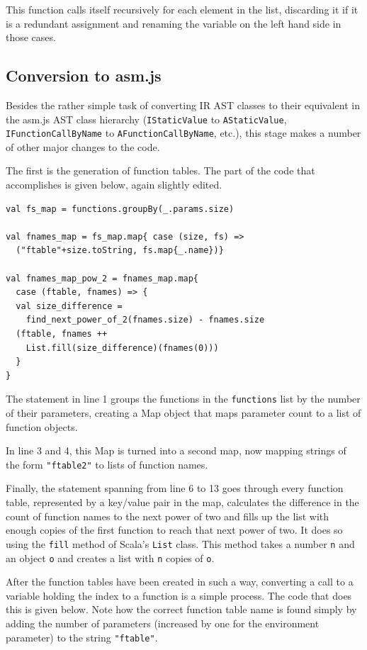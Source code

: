 \documentclass[11pt]{report}
\begin{document}
This function calls itself recursively for each element in the list, discarding it if it is a redundant assignment and renaming the variable on the left hand side in those cases.

\subsection{Conversion to asm.js}
Besides the rather simple task of converting IR AST classes to their equivalent in the asm.js AST class hierarchy (\texttt{IStaticValue} to \texttt{AStaticValue}, \texttt{IFunctionCallByName} to \texttt{AFunctionCallByName}, etc.), this stage makes a number of other major changes to the code.

The first is the generation of function tables. The part of the code that accomplishes is given below, again slightly edited.

\begin{lstlisting}
val fs_map = functions.groupBy(_.params.size)

val fnames_map = fs_map.map{ case (size, fs) => 
  ("ftable"+size.toString, fs.map{_.name})}
  
val fnames_map_pow_2 = fnames_map.map{ 
  case (ftable, fnames) => {
  val size_difference = 
    find_next_power_of_2(fnames.size) - fnames.size
  (ftable, fnames ++ 
    List.fill(size_difference)(fnames(0)))
  }
}
\end{lstlisting}

The statement in line 1 groups the functions in the \texttt{functions} list by the number of their parameters, creating a Map object that maps parameter count to a list of function objects.

In line 3 and 4, this Map is turned into a second map, now mapping strings of the form \texttt{"ftable2"} to lists of function names.

Finally, the statement spanning from line 6 to 13 goes through every function table, represented by a key/value pair in the map, calculates the difference in the count of function names to the next power of two and fills up the list with enough copies of the first function to reach that next power of two. It does so using the \texttt{fill} method of Scala's \texttt{List} class. This method takes a number \texttt{n} and an object \texttt{o} and creates a list with \texttt{n} copies of \texttt{o}.

After the function tables have been created in such a way, converting a call to a variable holding the index to a function is a simple process. The code that does this is given below. Note how the correct function table name is found simply by adding the number of parameters (increased by one for the environment parameter) to the string \texttt{"ftable"}.
\end{document}
